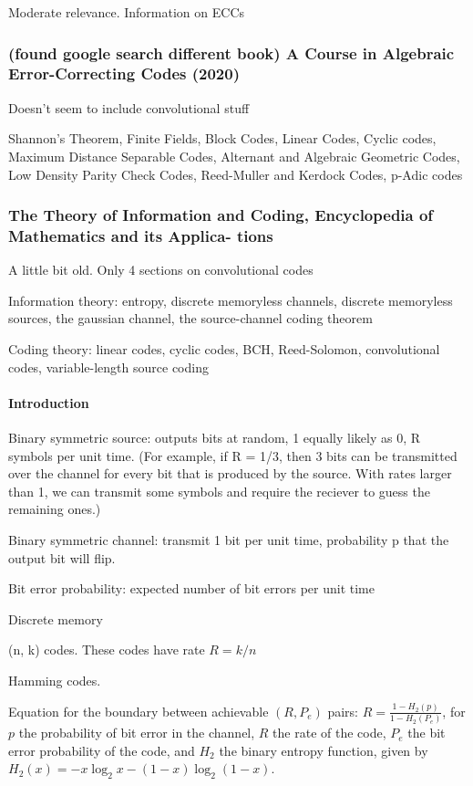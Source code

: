 \documentclass{article}
\begin{document}
Moderate relevance. Information on ECCs

\subsubsection{(found google search different book) A Course in Algebraic Error-Correcting Codes (2020)}

Doesn't seem to include convolutional stuff

Shannon's Theorem, Finite Fields, Block Codes, Linear Codes, Cyclic codes, Maximum Distance Separable Codes, Alternant and Algebraic Geometric Codes, Low Density Parity Check Codes, Reed-Muller and Kerdock Codes, p-Adic codes

\subsubsection{The Theory of Information and Coding, Encyclopedia of Mathematics and its Applica-
tions}

A little bit old. Only 4 sections on convolutional codes

Information theory: entropy, discrete memoryless channels, discrete memoryless sources, the gaussian channel, the source-channel coding theorem

Coding theory: linear codes, cyclic codes, BCH, Reed-Solomon, convolutional codes, variable-length source coding

\paragraph{Introduction}

Binary symmetric source: outputs bits at random, 1 equally likely as 0, R symbols per unit time. (For example, if R = 1/3, then 3 bits can be transmitted over the channel for every bit that is produced by the source. With rates larger than 1, we can transmit some symbols and require the reciever to guess the remaining ones.)

Binary symmetric channel: transmit 1 bit per unit time, probability p that the output bit will flip.

Bit error probability: expected number of bit errors per unit time

Discrete memory

(n, k) codes. These codes have rate $R = k/n$

Hamming codes.

Equation for the boundary between achievable $(R, P_e)$ pairs: $R = \frac{1 - H_2(p)}{1 - H_2(P_e)}$, for $p$ the probability of bit error in the channel, $R$ the rate of the code, $P_e$ the bit error probability of the code, and $H_2$ the binary entropy function, given by $H_2(x) = -x\log_2 x - (1 - x) \log_2(1-x)$.
\end{document}
